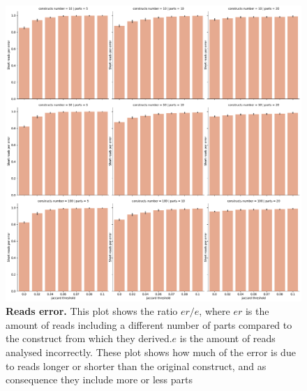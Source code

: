 \documentclass[11pt, a4paper]{article}
\begin{document}
 \begin{figure}[ht]
    \begin{center}
    \includegraphics[width=1.35\textwidth]{../results/images_notebook/v_450/sim_00_short_reads_per_error.pdf}
    \end{center}
    \caption{{\bf Reads error.}  This plot shows the ratio $er/e$, where $er$ is the amount of reads including a different number of parts compared to the construct from which they derived.$e$ is the amount of reads analysed incorrectly. These plot shows how much of the error is due to reads longer or shorter than the original construct, and as consequence they include more or less parts}
   \label{fig:v_450_parts_error }
\end{figure}
\end{document}
